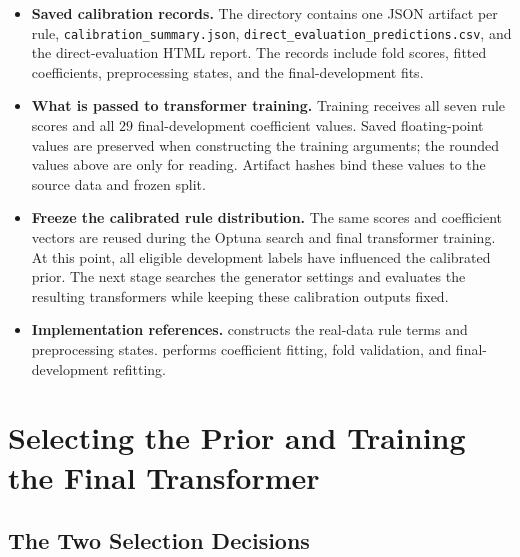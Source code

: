 \documentclass[11pt]{article}
\newenvironment{notes}
  {\begin{itemize}\setlength{\itemsep}{0.45em}\setlength{\parsep}{0pt}}
  {\end{itemize}}
\begin{document}
\begin{notes}
    \item \textbf{Saved calibration records.}
    The directory
    contains one JSON artifact per rule,
    \texttt{calibration\_summary.json},
    \texttt{direct\_evaluation\_predictions.csv}, and the
    direct-evaluation HTML report. The records include fold
    scores, fitted coefficients, preprocessing states, and
    the final-development fits.

    \item \textbf{What is passed to transformer training.}
    Training receives all seven rule scores and all
    \(29\) final-development coefficient values.
    Saved floating-point values are preserved when constructing
    the training arguments; the rounded values above are
    only for reading. Artifact hashes bind these values to
    the source data and frozen split.

    \item \textbf{Freeze the calibrated rule distribution.}
    The same scores and coefficient vectors are reused during
    the Optuna search and final transformer training.
    At this point, all eligible development labels have
    influenced the calibrated prior. The next stage searches
    the generator settings and evaluates the resulting
    transformers while keeping these calibration outputs fixed.

    \item \textbf{Implementation references.}
     constructs
    the real-data rule terms and preprocessing states.
    performs coefficient fitting, fold validation, and
    final-development refitting.
\end{notes}

\section{Selecting the Prior and Training the Final Transformer}
\label{sec:model-selection}

\subsection{The Two Selection Decisions}
\label{sec:selection-sequence}
\end{document}

